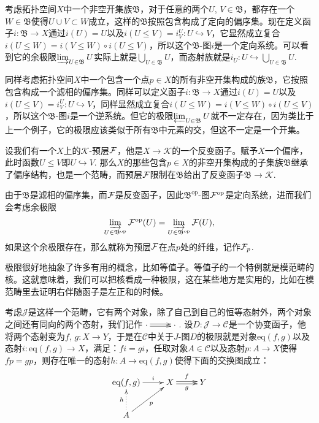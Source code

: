 考虑拓扑空间$X$中一个非空开集族$\mathfrak{B}$，对于任意的两个$U$, $V\in \mathfrak{B}$，都存在一个$W\in \mathfrak{B}$使得$U\cup V\subset W$成立，这样的$\mathfrak{B}$按照包含构成了定向的偏序集。现在定义函子$i:\mathfrak{B}\to X$通过$i(U)=U$以及$i(U\leq V)=i^U_V:U\hookrightarrow V$，它显然成立复合$i(U\leq W)=i(V\leq W)\circ i(U\leq V)$，所以这个$\mathfrak{B}$-图$i$是一个定向系统。可以看到它的余极限$\varinjlim_{U\in \mathfrak{B}} U$实际上就是$\bigcup_{U\in \mathfrak{B}} U$，而态射族就是$i_U:U\hookrightarrow \bigcup_{U\in \mathfrak{B}} U$.

同样考虑拓扑空间$X$中一个包含一个点$p\in X$的所有非空开集构成的族$\mathfrak{B}$，它按照包含构成一个滤相的偏序集。同样可以定义函子$i:\mathfrak{B}\to X$通过$i(U)=U$以及$i(U\leq V)=i^U_V:U\hookrightarrow V$，同样显然成立复合$i(U\leq W)=i(V\leq W)\circ i(U\leq V)$，所以这个$\mathfrak{B}$-图$i$是一个逆系统。但它的极限$\varprojlim_{U\in \mathfrak{B}} U$就不一定存在，因为类比于上一个例子，它的极限应该类似于所有$\mathfrak{B}$中元素的交，但这不一定是一个开集。

\para 设我们有一个$X$上的$\mathcal{K}$-预层$\mathcal{F}$，他是$X\to \mathcal{K}$的一个反变函子。赋予$X$一个偏序，此时函数$U\leq V$即$U\hookrightarrow V$. 那么$X$的那些包含$p\in X$的非空开集构成的子集族$\mathfrak{B}$继承了偏序结构，也是一个范畴，而预层$\mathcal{F}$限制在$\mathfrak{B}$给出了反变函子$\mathfrak{B}\to \mathcal{K}$.

由于$\mathfrak{B}$是滤相的偏序集，而$\mathcal{F}$是反变函子，因此$\mathfrak{B}^{\mathrm{op}}$-图$\mathcal{F}^{\mathrm{op}}$是定向系统，进而我们会考虑余极限
\[
	\varinjlim_{U\in \mathfrak{B}^{\mathrm{op}}} \mathcal{F}^{\mathrm{op}}(U)=\varinjlim_{U\in \mathfrak{B}^{\mathrm{op}}} \mathcal{F}(U),
\]
如果这个余极限存在，那么就称为预层$\mathcal{F}$在点$p$处的纤维，记作$\mathcal{F}_p$.

\para 极限很好地抽象了许多有用的概念，比如等值子。等值子的一个特例就是模范畴的核。这就意味着，我们可以把核看成一种极限，这在某些地方是实用的，比如在模范畴里去证明右伴随函子是左正和的时候。

考虑$\mathcal{J}$是这样一个范畴，它有两个对象，除了自己到自己的恒等态射外，两个对象之间还有同向的两个态射，我们记作$\xymatrix{\cdot\ar@<0.3ex>[r] \ar@<-0.3ex>[r]&\cdot}$. 设$D:\mathcal{J}\to\mathcal{C}$是一个协变函子，他将两个态射变为$f$, $g:X\to Y$，于是在$\mathcal{C}$中关于$J$-图$D$的极限就是对象$\mathrm{eq}(f,g)$以及态射$i:\mathrm{eq}(f,g)\to X$，满足：$fi=gi$，任取对象$A\in \mathcal{C}$以及态射$p:A\to X$使得$fp=gp$，则存在唯一的态射$h:A\to \mathrm{eq}(f,g)$使得下面的交换图成立：
\[
\begin{xy}
	\xymatrix{
		\mathrm{eq}(f,g)\ar[r]^-{i}&X\ar@<0.3ex>[r]^-{f} \ar@<-0.3ex>[r]_-{g}&Y\\
		A\ar@{.>}[u]^-{h}\ar[ur]_-{p}
	}
\end{xy}
\]

